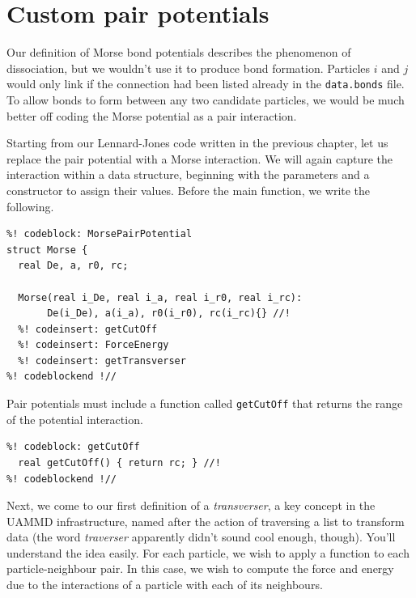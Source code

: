 \section{Custom pair potentials}

Our definition of Morse bond potentials describes the phenomenon of
dissociation, but we wouldn't use it to produce bond formation. Particles $i$
and $j$ would only link if the connection had been listed already in the
\texttt{data.bonds} file. To allow bonds to form between any two candidate
particles, we would be much better off coding the Morse potential as a pair
interaction.

Starting from our Lennard-Jones code written in the previous chapter, let us 
replace the pair potential with a Morse interaction. We will again capture the
interaction within a data structure, beginning with the parameters and a 
constructor to assign their values. Before the main function, we write the 
following.
\begin{lstlisting}
%! codeblock: MorsePairPotential
struct Morse {
  real De, a, r0, rc;

  Morse(real i_De, real i_a, real i_r0, real i_rc):
       De(i_De), a(i_a), r0(i_r0), rc(i_rc){} //!
  %! codeinsert: getCutOff
  %! codeinsert: ForceEnergy
  %! codeinsert: getTransverser
%! codeblockend !//
\end{lstlisting}
Pair potentials must include a function called \texttt{getCutOff} that returns
the range of the potential interaction.
\begin{lstlisting}
%! codeblock: getCutOff
  real getCutOff() { return rc; } //!
%! codeblockend !//
\end{lstlisting}

Next, we come to our first definition of a \textit{transverser}, a key concept 
in the UAMMD infrastructure, named after the action of traversing a list to 
transform data (the word \textit{traverser} apparently didn't sound cool enough, 
though). You'll understand the idea easily. For each particle, we wish to apply 
a function to each particle-neighbour pair. In this case, we wish to compute the 
force and energy due to the interactions of a particle with each of its 
neighbours.

